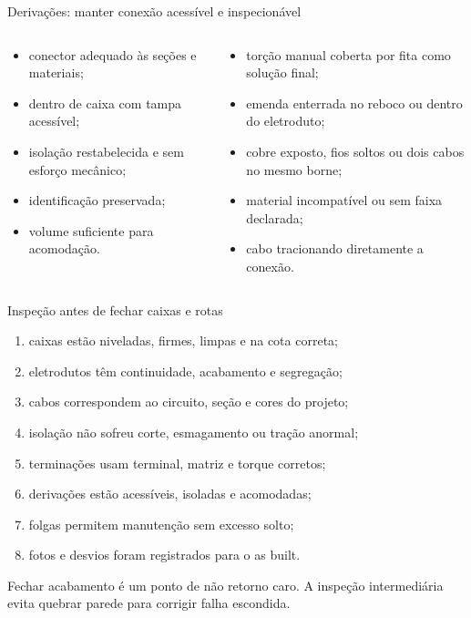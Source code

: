 \begin{frame}{Derivações: manter conexão acessível e inspecionável}
\small
\begin{columns}[T,onlytextwidth]
\begin{caixaNorma}[title=Conexão aceitável]
\begin{itemize}
\item conector adequado às seções e materiais;
\item dentro de caixa com tampa acessível;
\item isolação restabelecida e sem esforço mecânico;
\item identificação preservada;
\item volume suficiente para acomodação.
\end{itemize}
\end{caixaNorma}
\begin{caixaAt}[title=Conexão a rejeitar]
\begin{itemize}
\item torção manual coberta por fita como solução final;
\item emenda enterrada no reboco ou dentro do eletroduto;
\item cobre exposto, fios soltos ou dois cabos no mesmo borne;
\item material incompatível ou sem faixa declarada;
\item cabo tracionando diretamente a conexão.
\end{itemize}
\end{caixaAt}
\end{columns}
\end{frame}

\begin{frame}{Inspeção antes de fechar caixas e rotas}
\small
\begin{enumerate}
\item caixas estão niveladas, firmes, limpas e na cota correta;
\item eletrodutos têm continuidade, acabamento e segregação;
\item cabos correspondem ao circuito, seção e cores do projeto;
\item isolação não sofreu corte, esmagamento ou tração anormal;
\item terminações usam terminal, matriz e torque corretos;
\item derivações estão acessíveis, isoladas e acomodadas;
\item folgas permitem manutenção sem excesso solto;
\item fotos e desvios foram registrados para o as built.
\end{enumerate}
\begin{caixaProjeto}
Fechar acabamento é um ponto de não retorno caro. A inspeção intermediária evita quebrar parede para corrigir falha escondida.
\end{caixaProjeto}
\end{frame}
